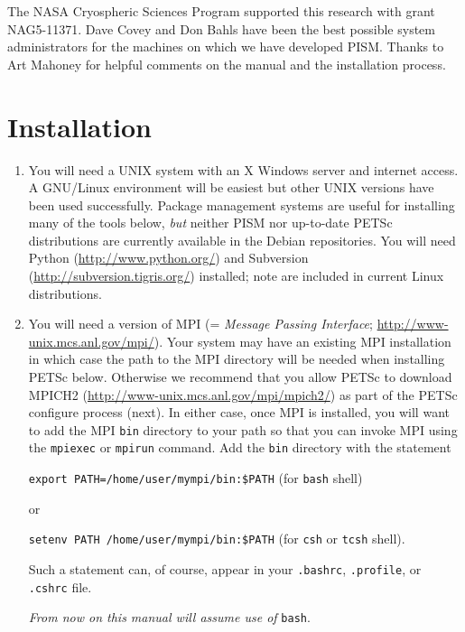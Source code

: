 \documentclass[11pt,final]{amsart}
\begin{document}
The NASA Cryospheric Sciences Program supported this research with grant NAG5-11371.  Dave Covey and Don Bahls have been the best possible system administrators for the machines on which we have developed PISM.  Thanks to Art Mahoney for helpful comments on the manual and the installation process.

\newpage
\section{Installation}\label{sect:install}

\renewcommand{\labelenumi}{\textbf{\arabic{enumi}.}~}
\begin{enumerate}
\item You will need a UNIX system with an X Windows server and internet access.  A GNU/Linux environment will be easiest but other UNIX versions have been used successfully.  Package management systems are useful for installing many of the tools below, \emph{but} neither PISM nor up-to-date PETSc distributions are currently available in the Debian repositories.  You will need Python (\url{http://www.python.org/}) and Subversion (\url{http://subversion.tigris.org/}) installed; note are included in current Linux distributions.

\item You will need a version of MPI (= \emph{Message Passing Interface}; \url{http://www-unix.mcs.anl.gov/mpi/}).  Your system may have an existing MPI installation in which case the path to the MPI directory will be needed when installing PETSc below.  Otherwise we recommend that you allow PETSc to download MPICH2 (\url{http://www-unix.mcs.anl.gov/mpi/mpich2/}) as part of the PETSc configure process (next).  In either case, once MPI is installed, you will want to add the MPI \verb|bin| directory to your path so that you can invoke MPI using the \verb|mpiexec| or \verb|mpirun| command.  Add the \verb|bin| directory with the statement

\verb|export PATH=/home/user/mympi/bin:$PATH|  \qquad (for \verb|bash| shell)

\noindent or

\verb|setenv PATH /home/user/mympi/bin:$PATH|  \qquad (for \verb|csh| or \verb|tcsh| shell).

\noindent Such a statement can, of course, appear in your \verb|.bashrc|, \verb|.profile|, or \verb|.cshrc| file.  

\emph{From now on this manual will assume use of} \verb|bash|.


\end{enumerate}
\end{document}
